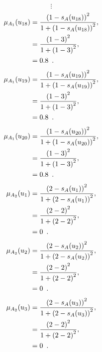 \documentclass[a4paper,openany]{book}
\begin{document}
				\[
					\vdots
				\]
				\begin{align}
					\mu_{A_1}(u_{18}) &= \frac{\left(1-s_A(u_{18})\right)^2}{1 + \left(1-s_A(u_{18})\right)^2} ,\\
					&= \frac{\left(1-3\right)^2}{1 + \left(1-3\right)^2} \notag ,\\
					&= 0.8 \enspace. \notag
				\end{align}
				\begin{align}
					\mu_{A_1}(u_{19}) &= \frac{\left(1-s_A(u_{19})\right)^2}{1 + \left(1-s_A(u_{19})\right)^2} ,\\
					&= \frac{\left(1-3\right)^2}{1 + \left(1-3\right)^2} \notag ,\\
					&= 0.8 \enspace. \notag
				\end{align}
				\begin{align}
					\mu_{A_1}(u_{20}) &= \frac{\left(1-s_A(u_{20})\right)^2}{1 + \left(1-s_A(u_{20})\right)^2} ,\\
					&= \frac{\left(1-3\right)^2}{1 + \left(1-3\right)^2} \notag ,\\
					&= 0.8 \enspace. \notag
				\end{align}
				\begin{align}
					\mu_{A_2}(u_1) &= \frac{\left(2-s_A(u_1)\right)^2}{1 + \left(2-s_A(u_1)\right)^2} ,\\
					&= \frac{\left(2-2\right)^2}{1 + \left(2-2\right)^2} \notag ,\\
					&= 0 \enspace. \notag
				\end{align}
				\begin{align}
					\mu_{A_2}(u_2) &= \frac{\left(2-s_A(u_2)\right)^2}{1 + \left(2-s_A(u_2)\right)^2} ,\\
					&= \frac{\left(2-2\right)^2}{1 + \left(2-2\right)^2} \notag ,\\
					&= 0 \enspace. \notag
				\end{align}
				\begin{align}
					\mu_{A_2}(u_3) &= \frac{\left(2-s_A(u_3)\right)^2}{1 + \left(2-s_A(u_3)\right)^2} ,\\
					&= \frac{\left(2-2\right)^2}{1 + \left(2-2\right)^2} \notag ,\\
					&= 0 \enspace. \notag
				\end{align}
\end{document}
